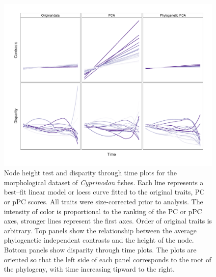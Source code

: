 \documentclass[a4paper,11pt]{article}
\begin{document}
\begin{figure}[p]
\centering
\includegraphics[scale=0.65]{fig/cypri_nh-dtt.pdf}
\caption{Node height test and disparity through time plots for the morphological dataset of \textit{Cyprinodon} fishes. Each line represents a best--fit linear model or loess curve fitted to the original traits, PC or pPC scores. All traits were size-corrected prior to analysis. The intensity of color is proportional to the ranking of the PC or pPC axes, stronger lines represent the first axes. Order of original traits is arbitrary. Top panels show the relationship between the average phylogenetic independent contrasts and the height of the node. Bottom panels show disparity through time plots. The plots are oriented so that the left side of each panel corresponds to the root of the phylogeny, with time increasing tipward to the right.}
\label{cypri.nh}
\end{figure}
\end{document}
